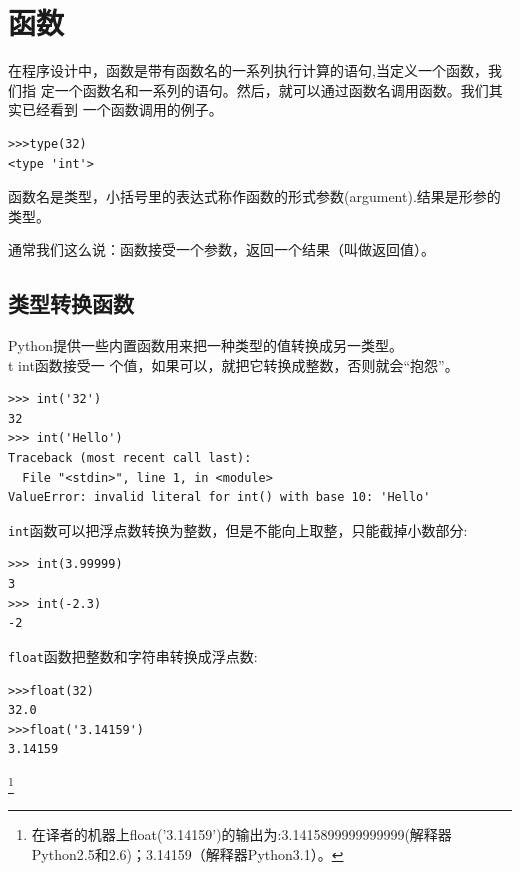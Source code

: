 \chapter{函数}
\label{funcchap}

在程序设计中，函数是带有函数名的一系列执行计算的语句,当定义一个函数，我们指
定一个函数名和一系列的语句。然后，就可以通过函数名调用函数。我们其实已经看到
一个函数调用的例子。

\beforeverb
\begin{verbatim}
>>>type(32)
<type 'int'>
\end{verbatim}
\afterverb

函数名是类型，小括号里的表达式称作函数的形式参数(argument).结果是形参的类型。


通常我们这么说：函数接受一个参数，返回一个结果（叫做返回值）。


\section{类型转换函数}

Python提供一些内置函数用来把一种类型的值转换成另一类型。{\\t int}函数接受一
个值，如果可以，就把它转换成整数，否则就会“抱怨”。


\beforeverb
\begin{verbatim}
>>> int('32')
32
>>> int('Hello')
Traceback (most recent call last):
  File "<stdin>", line 1, in <module>
ValueError: invalid literal for int() with base 10: 'Hello'
\end{verbatim}
\afterverb

{\tt int}函数可以把浮点数转换为整数，但是不能向上取整，只能截掉小数部分:

\beforeverb
\begin{verbatim}
>>> int(3.99999)
3
>>> int(-2.3)
-2
\end{verbatim}
\afterverb

{\tt float}函数把整数和字符串转换成浮点数:


\beforeverb
\begin{verbatim}
>>>float(32)
32.0
>>>float('3.14159')
3.14159
\end{verbatim}
\afterverb \footnote{在译者的机器上float('3.14159')的输出为:3.1415899999999999(解释器Python2.5和2.6)；3.14159（解释器Python3.1）。}

